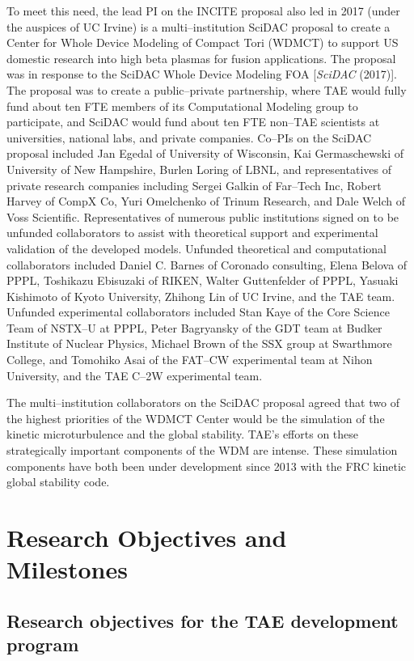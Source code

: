 \documentclass[a4paper,openany,12pt]{book}
\begin{document}
To meet this need, the lead PI on the INCITE proposal also led in 2017 (under the auspices of UC Irvine) is a multi--institution SciDAC proposal to create a Center for Whole Device Modeling of Compact Tori (WDMCT) to support US domestic research into high beta plasmas for fusion applications. The proposal was in response to the SciDAC Whole Device Modeling FOA [\emph{SciDAC} (2017)]. The proposal was to create a public--private partnership, where TAE would fully fund about ten FTE members of its Computational Modeling group to participate, and SciDAC would fund about ten FTE non--TAE scientists at universities, national labs, and private companies. Co--PIs on the SciDAC proposal included Jan Egedal of University of Wisconsin, Kai Germaschewski of University of New Hampshire, Burlen Loring of LBNL, and representatives of private research companies including Sergei Galkin of Far--Tech Inc, Robert Harvey of CompX Co, Yuri Omelchenko of Trinum Research, and Dale Welch of Voss Scientific. Representatives of numerous public institutions signed on to be unfunded collaborators to assist with theoretical support and experimental validation of the developed models. Unfunded theoretical and computational collaborators included Daniel C. Barnes of Coronado consulting, Elena Belova of PPPL, Toshikazu Ebisuzaki of RIKEN, Walter Guttenfelder of PPPL, Yasuaki Kishimoto of Kyoto University, Zhihong Lin of UC Irvine, and the TAE team. Unfunded experimental collaborators included Stan Kaye of the Core Science Team of NSTX--U at PPPL, Peter Bagryansky of the GDT team at Budker Institute of Nuclear Physics, Michael Brown of the SSX group at Swarthmore College, and Tomohiko Asai of the FAT--CW experimental team at Nihon University, and the TAE C--2W experimental team.

The multi--institution collaborators on the SciDAC proposal agreed that two of the highest priorities of the WDMCT Center would be the simulation of the kinetic microturbulence and the global stability. TAE's efforts on these strategically important components of the WDM are intense. These simulation components have both been under development since 2013 with the FRC kinetic global stability code.

\section{Research Objectives and Milestones}

\subsection{Research objectives for the TAE development program}
\end{document}
